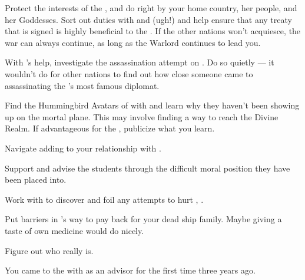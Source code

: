\documentclass[char]{GL2020}
\begin{document}
\begin{itemz}
    \item Protect the interests of the \pShip{}, and do right by your home country, her people, and her Goddesses. Sort out duties with \cEbbPriest{} and \cChupLeader{} (ugh!) and help ensure that any treaty that is signed is highly beneficial to the \pShippies{}. If the other nations won't acquiesce, the war can always continue, as long as the Warlord continues to lead you.
    \item With \cPresident{}'s help, investigate the assassination attempt on \cHeadDiplomat{}. Do so quietly — it wouldn't do for other nations to find out how close someone came to assassinating the \pShip{}'s most famous diplomat.
    \item Find the Hummingbird Avatars of \cFarmGod{} with \cDisney{} and learn why they haven’t been showing up on the mortal plane. This may involve finding a way to reach the Divine Realm. If advantageous for the \pShip{}, publicize what you learn. 
    \item Navigate adding \cEthics{} to your relationship with \cBeetle{}.
\end{itemz}

\begin{itemz}
    \item Support and advise the \pShip{} students through the difficult moral position they have been placed into. 
    \item Work with \cWarlordDaughter{} to discover and foil any attempts to hurt \cWarlordDaughter{\their} \cLoud{\parent}, \cLoud{}.
\item Put barriers in \cCurse{}’s way to pay \cCurse{\them} back for your dead ship family. Maybe giving \cCurse{} a taste of \cCurse{\their} own medicine would do nicely.
    \item Figure out who \cBunker{} really is. 
\end{itemz}

\begin{itemz}[Notes]
    \item You came to the \pSchool{} with \cHeadDiplomat{} as an advisor for the first time three years ago.
\end{itemz}
\end{document}
